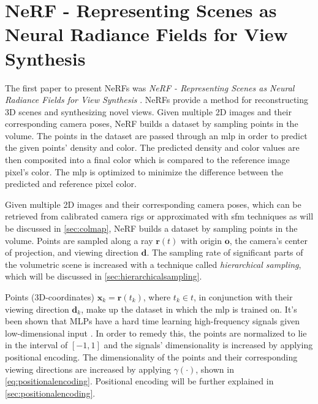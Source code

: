 \section[NeRF]{NeRF - Representing Scenes as Neural Radiance Fields for View Synthesis} \label{sec:nerf}
The first paper to present NeRFs was \textit{NeRF - Representing Scenes as Neural Radiance Fields for View Synthesis} \cite{mildenhall_nerf_2020}. NeRFs provide a method for reconstructing 3D scenes and synthesizing novel views. Given multiple 2D images and their corresponding camera poses, NeRF builds a dataset by sampling points in the volume. The points in the dataset are passed through an \acrshort{mlp} in order to predict the given points' density and color. The predicted density and color values are then composited into a final color which is compared to the reference image pixel's color. The \acrshort{mlp} is optimized to minimize the difference between the predicted and reference pixel color.


Given multiple 2D images and their corresponding camera poses, which can be retrieved from calibrated camera rigs or approximated with \acrfull{sfm} techniques as will be discussed in \autoref{sec:colmap}, NeRF builds a dataset by sampling points in the volume. Points are sampled along a ray $\pmb{r}(t)$ with origin $\textbf{o}$, the camera's center of projection, and viewing direction $\textbf{d}$. The sampling rate of significant parts of the volumetric scene is increased with a technique called \textit{hierarchical sampling}, which will be discussed in \autoref{sec:hierarchicalsampling}.




Points (3D-coordinates) $\pmb{x}_k = \pmb{r}(t_k)$, where $t_k \in t$, in conjunction with their viewing direction $\pmb{d}_k$, make up the dataset in which the \acrshort{mlp} is trained on. It's been shown that MLPs have a hard time learning high-frequency signals given low-dimensional input \cite{tancik_fourier_2020}. In order to remedy this, the points are normalized to lie in the interval of $[-1, 1]$ and the signals' dimensionality is increased by applying positional encoding. The dimensionality of the points and their corresponding viewing directions are increased by applying $\gamma(\cdot)$, shown in \autoref{eq:positionalencoding}. Positional encoding will be further explained in \autoref{sec:positionalencoding}.

